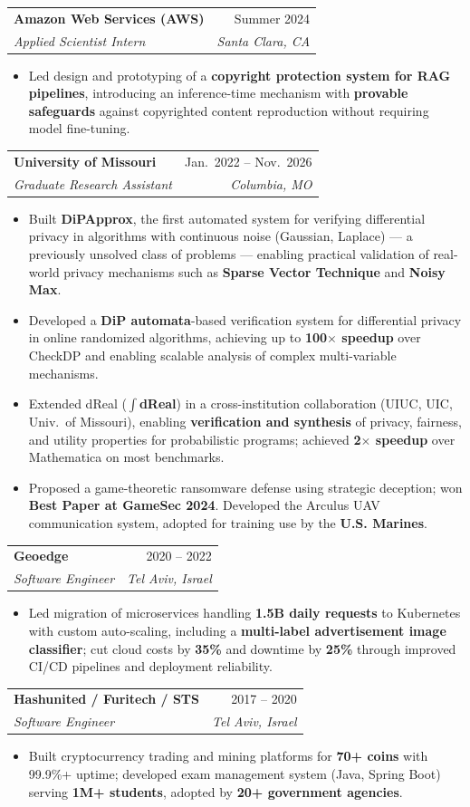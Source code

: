 \documentclass[letterpaper,11pt]{article}
\makeatletter
\newcommand{\resumeItem}[1]{\item\small{{#1 \vspace{-2pt}}}}
\newcommand{\resumeSubheading}[4]{
  \vspace{-2pt}\item
    {\small\begin{tabular*}{0.97\textwidth}[t]{l@{\extracolsep{\fill}}r}
      \textbf{#1} & #2 \\
      \textit{#3} & \textit{#4} \\
    \end{tabular*}}\vspace{-7pt}
}
\newcommand{\resumeItemListStart}{\begin{itemize}[leftmargin=0.15in, topsep=4pt]}
\newcommand{\resumeItemListEnd}{\end{itemize}\vspace{-0.5pt}}
\makeatother
\begin{document}
  \resumeSubheading{Amazon Web Services (AWS)}{Summer 2024}{Applied Scientist Intern}{Santa Clara, CA}
  \resumeItemListStart
    \resumeItem{Led design and prototyping of a \textbf{copyright protection system for RAG pipelines}, introducing an inference-time mechanism with \textbf{provable safeguards} against copyrighted content reproduction without requiring model fine-tuning.}
  \resumeItemListEnd

  \resumeSubheading{University of Missouri}{Jan.\ 2022 -- Nov.\ 2026}{Graduate Research Assistant}{Columbia, MO}
  \resumeItemListStart
    \resumeItem{Built \textbf{DiPApprox}, the first automated system for verifying differential privacy in algorithms with continuous noise (Gaussian, Laplace) --- a previously unsolved class of problems --- enabling practical validation of real-world privacy mechanisms such as \textbf{Sparse Vector Technique} and \textbf{Noisy Max}.}
    \resumeItem{Developed a \textbf{DiP automata}-based verification system for differential privacy in online randomized algorithms, achieving up to \textbf{100$\times$ speedup} over CheckDP and enabling scalable analysis of complex multi-variable mechanisms.}
    \resumeItem{Extended dReal (\textbf{$\int$dReal}) in a cross-institution collaboration (UIUC, UIC, Univ.\ of Missouri), enabling \textbf{verification and synthesis} of privacy, fairness, and utility properties for probabilistic programs; achieved \textbf{2$\times$ speedup} over Mathematica on most benchmarks.}
    \resumeItem{Proposed a game-theoretic ransomware defense using strategic deception; won \textbf{Best Paper at GameSec 2024}. Developed the Arculus UAV communication system, adopted for training use by the \textbf{U.S. Marines}.}
  \resumeItemListEnd

  \resumeSubheading{Geoedge}{2020 -- 2022}{Software Engineer}{Tel Aviv, Israel}
  \resumeItemListStart
    \resumeItem{Led migration of microservices handling \textbf{1.5B daily requests} to Kubernetes with custom auto-scaling, including a \textbf{multi-label advertisement image classifier}; cut cloud costs by \textbf{35\%} and downtime by \textbf{25\%} through improved CI/CD pipelines and deployment reliability.}
  \resumeItemListEnd

  \resumeSubheading{Hashunited / Furitech / STS}{2017 -- 2020}{Software Engineer}{Tel Aviv, Israel}
  \resumeItemListStart
    \resumeItem{Built cryptocurrency trading and mining platforms for \textbf{70+ coins} with 99.9\%+ uptime; developed exam management system (Java, Spring Boot) serving \textbf{1M+ students}, adopted by \textbf{20+ government agencies}.}
  \resumeItemListEnd
\end{document}

